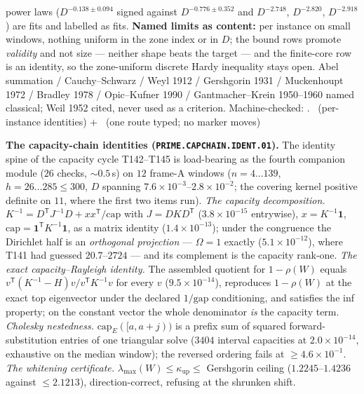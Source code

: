 \documentclass[11pt,a4paper]{article}
\theoremstyle{definition}
\begin{document}
power laws ($D^{-0.138\pm0.094}$ signed against $D^{-0.776\pm0.352}$ and
$D^{-2.748}$, $D^{-2.820}$, $D^{-2.918}$) are fits and labelled as fits.
\textbf{Named limits as content:} per instance on small windows, nothing uniform
in the zone index or in $D$; the bound rows promote \emph{validity} and not size
--- neither shape beats the target --- and the finite-core row is an identity, so
the zone-uniform discrete Hardy inequality stays open.
Abel summation / Cauchy--Schwarz / Weyl 1912 / Gershgorin 1931 / Muckenhoupt 1972
/ Bradley 1978 / Opic--Kufner 1990 / Gantmacher--Krein 1950--1960 named classical;
Weil 1952 cited, never used as a criterion.
Machine-checked:
.
\mE\ (per-instance identities) $+$ \mX\ (one route typed; no marker moves)

\par\smallskip\noindent\textbf{The capacity-chain identities
(\texttt{PRIME.CAPCHAIN.IDENT.01}).}
The identity spine of the capacity cycle T142--T145 is load-bearing as the
fourth companion module ($26$ checks, ${\sim}0.5$\,s) on $12$ frame-A windows
($n=4\ldots139$, $h=26\ldots285\le300$, $D$ spanning
$7.6\times10^{-3}$--$2.8\times10^{-2}$; the covering kernel positive definite on
$11$, where the first two items run).
\emph{The capacity decomposition.}
$K^{-1}=D^{\mathsf T}J^{-1}D+xx^{\mathsf T}/\mathrm{cap}$ with $J=DKD^{\mathsf T}$
($3.8\times10^{-15}$ entrywise), $x=K^{-1}\mathbf 1$,
$\mathrm{cap}=\mathbf 1^{\mathsf T}K^{-1}\mathbf 1$, as a matrix identity
($1.4\times10^{-13}$); under the congruence the Dirichlet half is an
\emph{orthogonal projection} --- $\Omega=1$ exactly ($5.1\times10^{-12}$), where
T141 had guessed $20.7$--$2724$ --- and its complement is the capacity rank-one.
\emph{The exact capacity--Rayleigh identity.} The assembled quotient for
$1-\rho(W)$ equals $v^{\mathsf T}(K^{-1}-H)v/v^{\mathsf T}K^{-1}v$ for every $v$
($9.5\times10^{-14}$), reproduces $1-\rho(W)$ at the exact top eigenvector under
the declared $1/\mathrm{gap}$ conditioning, and satisfies the inf property; on
the constant vector the whole denominator \emph{is} the capacity term.
\emph{Cholesky nestedness.} $\mathrm{cap}_E([a,a{+}j))$ is a prefix sum of
squared forward-substitution entries of one triangular solve ($3404$ interval
capacities at $2.0\times10^{-14}$, exhaustive on the median window); the
reversed ordering fails at $\ge4.6\times10^{-1}$.
\emph{The whitening certificate.} $\lambda_{\max}(W)\le\kappa_{\mathrm{up}}\le$
Gershgorin ceiling ($1.2245$--$1.4236$ against $\le2.1213$), direction-correct,
refusing at the shrunken shift.
\end{document}
